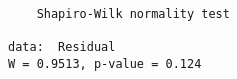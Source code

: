 \begin{verbatim} 

	Shapiro-Wilk normality test

data:  Residual
W = 0.9513, p-value = 0.124

\end{verbatim}